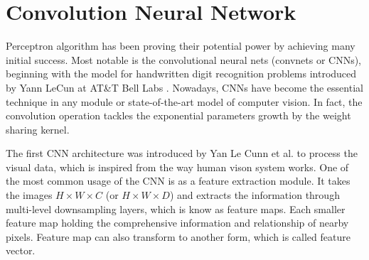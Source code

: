\section{Convolution Neural Network}
\label{sec:cnn}
Perceptron algorithm has been proving their potential power by achieving many initial success. Most notable is the convolutional neural nets (convnets or CNNs), beginning with the model for handwritten digit recognition problems introduced by Yann LeCun at AT&T Bell Labs \cite{lecun1989backpropagation}. Nowadays, CNNs have become the essential technique in any module or state-of-the-art model of computer vision. In fact, the convolution operation tackles the exponential parameters growth by the weight sharing kernel.

The first CNN architecture was introduced by Yan Le Cunn et al. \cite{lecun1989backpropagation} to process the visual data, which is inspired from the way human vison system works. One of the most common usage of the CNN is as a feature extraction module. It takes the images $H \times W \times C$ (or $H \times W \times D$) and extracts the information through multi-level downsampling layers, which is know as feature maps. Each smaller feature map holding the comprehensive information and relationship of nearby pixels. Feature map can also transform to another form, which is called feature vector.

